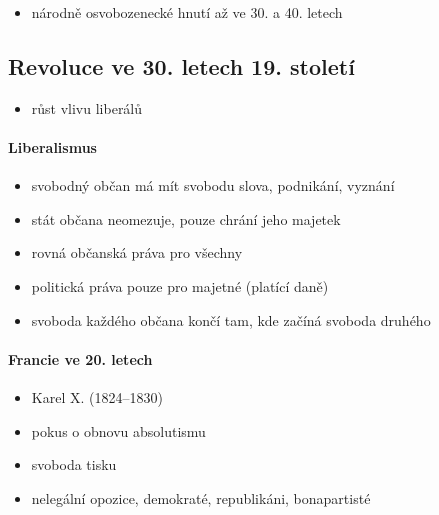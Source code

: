 \begin{itemize}
\item národně osvobozenecké hnutí až ve 30. a 40. letech
\end{itemize}



\subsection{Revoluce ve 30. letech 19. století}
\begin{itemize}
\item růst vlivu liberálů
\end{itemize}

\paragraph{Liberalismus}
\begin{itemize}
\item svobodný občan má mít svobodu slova, podnikání, vyznání
\item stát občana neomezuje, pouze chrání jeho majetek
\item rovná občanská práva pro všechny
\item politická práva pouze pro majetné (platící daně)
\item svoboda každého občana končí tam, kde začíná svoboda druhého
\end{itemize}

\paragraph{Francie ve 20. letech}
\begin{itemize}
\item Karel X. (1824--1830)
\item pokus o obnovu absolutismu
\item svoboda tisku
\item nelegální opozice, demokraté, republikáni, bonapartisté
\end{itemize}

